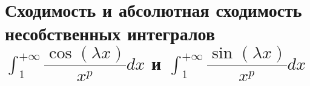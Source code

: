 \documentclass[../main.tex]{subfiles}
\begin{document}
\newpage
\section{Сходимость и абсолютная сходимость несобственных интегралов \( \int_{ 1}^{ + \infty} \dfrac{ \cos\left(\lambda x\right)}{ x^p}dx\) и \( \int_{ 1}^{ + \infty} \dfrac{ \sin\left(\lambda x\right)}{ x^p}dx\)}
\end{document}
